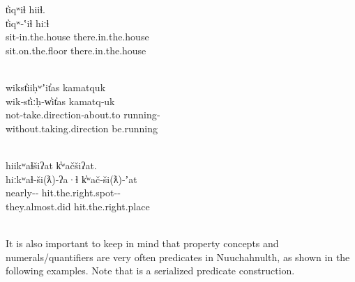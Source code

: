 \begin{exe}
  \ex\label{ex:3.14}
  \begin{xlist}

    \ex\label{ex:3.14a}
    \glllll  t̓iqʷiɬ           hiiɬ.\\
             t̓iqʷ‑ʽiɬ         hiːɬ\\
             sit‑in.the.house there.in.the.house\\
             sit.on.the.floor there.in.the.house\\
                     
             \\

    \ex\label{ex:3.14b}
    \glllll wikst̓iiḥʷʼit̓as              kamatquk\\
            wik‑st̓iːḥ‑w̓it̓as             kamatq‑uk\\
            not‑take.direction‑about.to running‑\\
            without.taking.direction    be.running\\
                               \\

    \ex\label{ex:3.14c}
    \glllll hiikʷaɬšiʔat            k̓ʷačšiʔat.\\
            hiːkʷaɬ‑ši(ƛ)‑ʔa·ɬ      k̓ʷač‑ši(ƛ)‑ʼat\\
            nearly‑‑ hit.the.right.spot‑‑\\
            they.almost.did         hit.the.right.place\\
                           \\

  \end{xlist}
\end{exe}

It is also important to keep in mind that property concepts and numerals/quantifiers are very often predicates in Nuuchahnulth, as shown in the following examples. Note that  is a serialized predicate construction.

